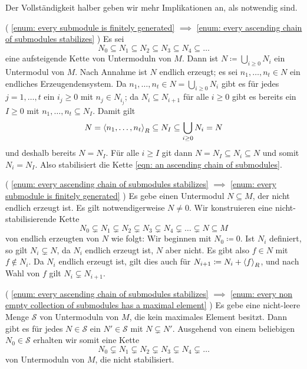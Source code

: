 \begin{solution}
  Der Vollständigkeit halber geben wir mehr Implikationen an, als notwendig sind.
  
  (
  \ref{enum: every submodule is finitely generated}
  $\implies$
  \ref{enum: every ascending chain of submodules stabilizes}
  )
  Es sei
  \begin{equation}
    \label{eqn: an ascending chain of submodules}
              N_0
    \subseteq N_1
    \subseteq N_2
    \subseteq N_3
    \subseteq N_4
    \subseteq \dotso
  \end{equation}
  eine aufsteigende Kette von Untermoduln von $M$.
  Dann ist $N \coloneqq \bigcup_{i \geq 0} N_i$ ein Untermodul von $M$.
  Nach Annahme ist $N$ endlich erzeugt; es sei $n_1, \dotsc, n_t \in N$ ein endliches Erzeugendensystem.
  Da $n_1, \dotsc, n_t \in N = \bigcup_{i \geq 0} N_i$ gibt es für jedes $j = 1, \dotsc, t$ ein $i_j \geq 0$ mit $n_j \in N_{i_j}$;
  da $N_i \subseteq N_{i+1}$ für alle $i \geq 0$ gibt es bereits ein $I \geq 0$ mit $n_1, \dotsc, n_t \subseteq N_I$.
  Damit gilt
  \[
              N
    =         \left\langle n_1, \dotsc, n_t \right\rangle_R
    \subseteq N_I
    \subseteq \bigcup_{i \geq 0} N_i
    =         N
  \]
  und deshalb bereits $N = N_I$.
  Für alle $i \geq I$ git dann $N = N_I \subseteq N_i \subseteq N$ und somit $N_i = N_I$.
  Also stabilisiert die Kette \eqref{eqn: an ascending chain of submodules}.
  
  (
  \ref{enum: every ascending chain of submodules stabilizes}
  $\implies$
  \ref{enum: every submodule is finitely generated}
  )
  Es gebe einen Untermodul $N \subseteq M$, der nicht endlich erzeugt ist.
  Es gilt notwendigerweise $N \neq 0$.
  Wir konstruieren eine nicht-stabilisierende Kette
  \[
                N_0
    \subsetneq  N_1
    \subsetneq  N_2
    \subsetneq  N_3
    \subsetneq  N_4
    \subsetneq \dotso
    \subsetneq  N
    \subseteq   M
  \]
  von endlich erzeugten von $N$ wie folgt:
  Wir beginnen mit $N_0 \coloneqq 0$.
  Ist $N_i$ definiert, so gilt $N_i \subsetneq N$, da $N_i$ endlich erzeugt ist, $N$ aber nicht. 
  Es gibt also $f \in N$ mit $f \notin N_i$.
  Da $N_i$ endlich erzeugt ist, gilt dies auch für $N_{i+1} \coloneqq N_i + \left\langle f \right\rangle_R$, und nach Wahl von $f$ gilt $N_i \subsetneq N_{i+1}$.
  
  
  (
  \ref{enum: every ascending chain of submodules stabilizes}
  $\implies$
  \ref{enum: every non empty collection of submodules has a maximal element}
  )
  Es gebe eine nicht-leere Menge $\mathcal{S}$ von Untermoduln von $M$, die kein maximales Element besitzt.
  Dann gibt es für jedes $N \in \mathcal{S}$ ein $N' \in \mathcal{S}$ mit $N \subsetneq N'$.
  Ausgehend von einem beliebigen $N_0 \in \mathcal{S}$ erhalten wir somit eine Kette
  \[
                N_0
    \subsetneq  N_1
    \subsetneq  N_2
    \subsetneq  N_3
    \subsetneq  N_4
    \subsetneq \dotso
  \]
  von Untermoduln von $M$, die nicht stabilisiert.
  

\end{solution}
